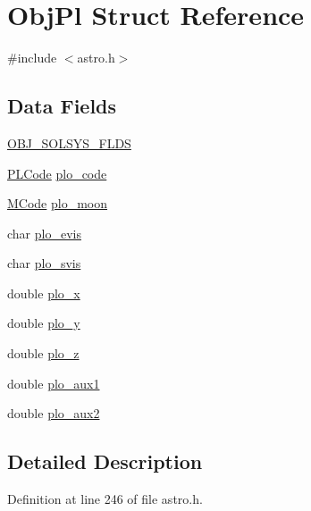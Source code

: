 \hypertarget{struct_obj_pl}{\section{Obj\-Pl Struct Reference}
\label{struct_obj_pl}
}


{\ttfamily \#include $<$astro.\-h$>$}

\subsection*{Data Fields}
\begin{DoxyCompactItemize}
\item 
\hyperlink{struct_obj_pl_a758fc78bac5693d80061b5287111660b}{O\-B\-J\-\_\-\-S\-O\-L\-S\-Y\-S\-\_\-\-F\-L\-D\-S}
\item 
\hyperlink{astro_8h_a2a6f493a094887058ce904937bb27647}{P\-L\-Code} \hyperlink{struct_obj_pl_afb2477614c13497d5437e74077dfa1ee}{plo\-\_\-code}
\item 
\hyperlink{astro_8h_ac0d9b5d3144a9cf8616c62dad3579db7}{M\-Code} \hyperlink{struct_obj_pl_ae1eeda4bb29ca8b3a07fdc90900a01f7}{plo\-\_\-moon}
\item 
char \hyperlink{struct_obj_pl_abaec487e4acac909942b434c8236c0c9}{plo\-\_\-evis}
\item 
char \hyperlink{struct_obj_pl_a77100a6431b4b0ca583835503381d92c}{plo\-\_\-svis}
\item 
double \hyperlink{struct_obj_pl_a78fcdddb0a9533018c4dad44ad6f85c7}{plo\-\_\-x}
\item 
double \hyperlink{struct_obj_pl_a8fc64c88e1982858a9537489b405d73a}{plo\-\_\-y}
\item 
double \hyperlink{struct_obj_pl_acd4ef2a16d86c17de03a5da0f8fa6a6a}{plo\-\_\-z}
\item 
double \hyperlink{struct_obj_pl_a24eecaf3b6c18c76b37a7bdbe25aaf36}{plo\-\_\-aux1}
\item 
double \hyperlink{struct_obj_pl_a255117a42ec67b58e521a19136d27af2}{plo\-\_\-aux2}
\end{DoxyCompactItemize}


\subsection{Detailed Description}


Definition at line 246 of file astro.\-h.




